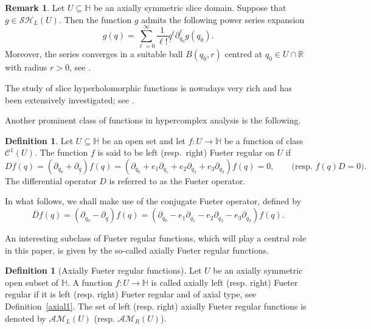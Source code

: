 \documentclass[reqno,11pt]{amsart}
\numberwithin{equation}{section}
\theoremstyle{definition}
\newtheorem{remark}[theorem]{{\bf Remark}}
\newtheorem{definition}[theorem]{Definition}
\begin{document}
\begin{remark}
	Let $U \subseteq \mathbb{H}$ be an axially symmetric slice domain. Suppose that $g \in \mathcal{SH}_L(U)$. Then the function $g$ admits the following power series expansion
	\begin{equation}
		\label{exp}
		g(q)= \sum_{\ell=0}^{\infty} \frac{1}{\ell!} \underline{q}^\ell \partial_{q_0}^\ell  g(q_0).
	\end{equation}
	Moreover, the series converges in a suitable ball $B(q_0,r)$ centred at $q_0 \in U \cap \mathbb{R}$ with radius $r>0$, see \cite{CSSisrael1, CSSisrael2}.
\end{remark}

The study of slice hyperholomorphic functions is nowadays very rich and has been extensively investigated; see \cite{bookCG, CGK, CSS, CSS2}.

Another prominent class of functions in hypercomplex analysis is the following.


\begin{definition}
Let $U \subseteq \mathbb{H}$ be an open set and let  $f \colon U \to \mathbb{H}$ be a function of class $\mathcal{C}^1(U)$.  The function $f$ is said to be left (resp.\ right) Fueter regular on $U$ if
$$
Df(q)= (\partial_{q_0}+\partial_{\underline{q}})f(q)= \left(\partial_{q_0}+ e_1 \partial_{q_1}
+ e_2 \partial_{q_2}+ e_3 \partial_{q_3}\right) f(q)= 0,
\qquad
\text{(resp.\ } f(q)D=0\text{)}.
$$
The differential operator $D$ is referred to as the Fueter operator.
\end{definition}

In what follows, we shall make use of the conjugate Fueter operator, defined by
$$ \overline{D}f(q)=(\partial_{q_0}-\partial_{\underline{q}})f(q)=\left(\partial_{q_0}-e_1 \partial_{q_1}-e_2 \partial_{q_2}-e_3 \partial_{q_3}\right)f(q).$$

An interesting subclass of Fueter regular functions, which will play a central role in this paper, is given by the so-called axially Fueter regular functions.

\begin{definition}[Axially Fueter regular functions]
Let $U$ be an axially symmetric open subset of $\mathbb{H}$. A function $f : U \to \mathbb{H}$ is called axially left (resp. right) Fueter regular if it is left (resp. right) Fueter regular and of axial type, see Definition~\ref{axial1}. The set of left (resp. right) axially Fueter regular functions is denoted by $\mathcal{AM}_L(U)$ (resp. $\mathcal{AM}_R(U)$).
\end{definition}
\end{document}
